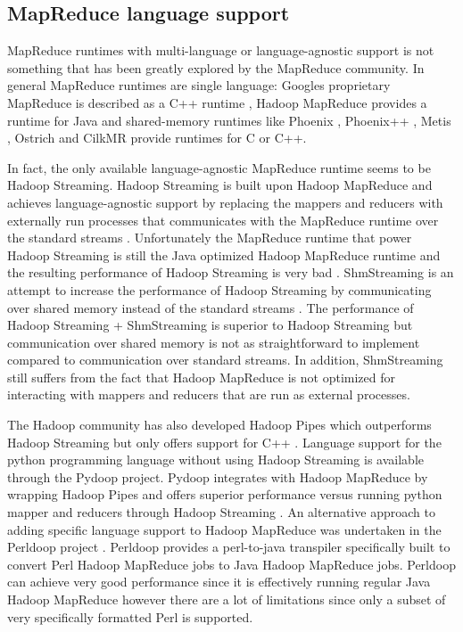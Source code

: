 \documentclass[11pt]{article}       %
\begin{document}
\subsection{MapReduce language support}

MapReduce runtimes with multi-language or language-agnostic support is not
something that has been greatly explored by the MapReduce community. In general
MapReduce runtimes are single language: Googles proprietary MapReduce is
described as a C++ runtime \cite{GoogleMapReduce}, Hadoop MapReduce provides a
runtime for Java \cite{Hadoop} and shared-memory runtimes like Phoenix
\cite{Phoenix}, Phoenix++ \cite{Phoenix++}, Metis \cite{Metis}, Ostrich
\cite{Ostrich} and CilkMR \cite{CilkMR} provide runtimes for C or C++.

In fact, the only available language-agnostic MapReduce runtime seems to be
Hadoop Streaming. Hadoop Streaming is built upon Hadoop MapReduce and achieves
language-agnostic support by replacing the mappers and reducers with externally
run processes that communicates with the MapReduce runtime over the standard
streams \cite{HadoopStreaming}. Unfortunately the MapReduce runtime that power
Hadoop Streaming is still the Java optimized Hadoop MapReduce runtime and the
resulting performance of Hadoop Streaming is very bad \cite{HadoopStreamingPerf}
\cite{Pydoop} \cite{Perldoop}. ShmStreaming is an attempt to increase the
performance of Hadoop Streaming by communicating over shared memory instead of
the standard streams \cite{ShmStreaming}. The performance of Hadoop Streaming +
ShmStreaming is superior to Hadoop Streaming but communication over shared
memory is not as straightforward to implement compared to communication over
standard streams. In addition, ShmStreaming still suffers from the fact that
Hadoop MapReduce is not optimized for interacting with mappers and reducers that
are run as external processes.

The Hadoop community has also developed Hadoop Pipes which outperforms Hadoop
Streaming but only offers support for C++ \cite{HadoopPipes}. Language support
for the python programming language without using Hadoop Streaming is available
through the Pydoop project. Pydoop integrates with Hadoop MapReduce by wrapping
Hadoop Pipes and offers superior performance versus running python mapper and
reducers through Hadoop Streaming \cite{Pydoop}. An alternative approach to
adding specific language support to Hadoop MapReduce was undertaken in the
Perldoop project \cite{Perldoop}. Perldoop provides a perl-to-java transpiler
specifically built to convert Perl Hadoop MapReduce jobs to Java Hadoop
MapReduce jobs. Perldoop can achieve very good performance since it is
effectively running regular Java Hadoop MapReduce however there are a lot of
limitations since only a subset of very specifically formatted Perl is
supported.
\end{document}
